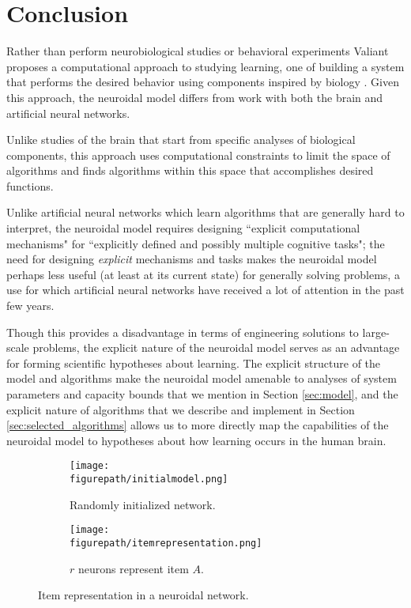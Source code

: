 \documentclass[letterpaper, 12pt]{article}
\newcommand{\figurepath}{../../Figures}
\begin{document}
\section{Conclusion}
Rather than perform neurobiological studies or behavioral experiments Valiant proposes a computational approach to studying learning, one of building a system that performs the desired behavior using components inspired by biology \cite{valiant_circuits_1994}. Given this approach, the neuroidal model differs from work with both the brain and artificial neural networks.

Unlike studies of the brain that start from specific analyses of biological components, this approach uses computational constraints to limit the space of algorithms and finds algorithms within this space that accomplishes desired functions.

Unlike artificial neural networks which learn algorithms that are generally hard to interpret, the neuroidal model requires designing ``explicit computational mechanisms" for ``explicitly defined and possibly multiple cognitive tasks"; the need for designing \textit{explicit} mechanisms and tasks makes the neuroidal model perhaps less useful (at least at its current state) for generally solving problems, a use for which artificial neural networks have received a lot of attention in the past few years.

Though this provides a disadvantage in terms of engineering solutions to large-scale problems, the explicit nature of the neuroidal model serves as an advantage for forming scientific hypotheses about learning. The explicit structure of the model and algorithms make the neuroidal model amenable to analyses of system parameters and capacity bounds that we mention in Section \ref{sec:model}, and the explicit nature of algorithms that we describe and implement in Section \ref{sec:selected_algorithms} allows us to more directly map the capabilities of the neuroidal model to hypotheses about how learning occurs in the human brain.




\begin{figure}[!htb]
\centering
\begin{subfigure}[b]{0.45\textwidth}
      \texttt{[image: \\figurepath/initialmodel.png]}
      \caption*{Randomly initialized network.}
\end{subfigure}
\begin{subfigure}[b]{0.45\textwidth}
      \texttt{[image: \\figurepath/itemrepresentation.png]}
      \caption*{$r$ neurons represent item $A$.}
\end{subfigure}
\caption{Item representation in a neuroidal network.}
\label{fig:itemrepresentation}
\end{figure}
\end{document}
